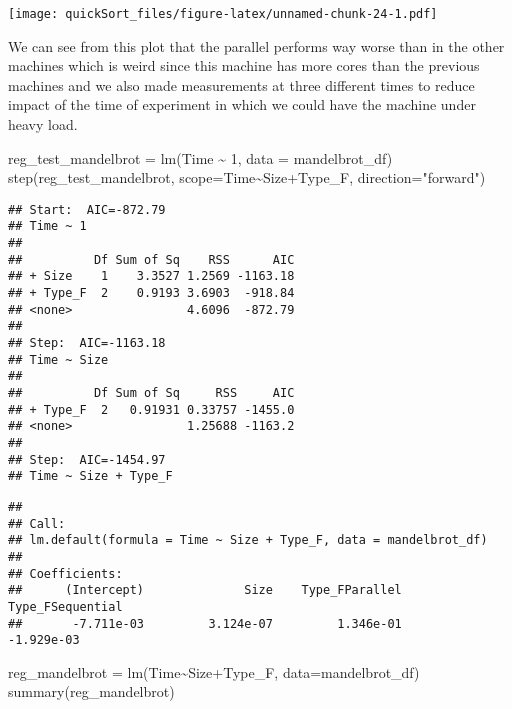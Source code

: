 \documentclass[
]{article}
\newenvironment{Shaded}{\begin{snugshade}}{\end{snugshade}}
\newcommand{\AttributeTok}[1]{\textcolor[rgb]{0.77,0.63,0.00}{#1}}
\newcommand{\DecValTok}[1]{\textcolor[rgb]{0.00,0.00,0.81}{#1}}
\newcommand{\FunctionTok}[1]{\textcolor[rgb]{0.00,0.00,0.00}{#1}}
\newcommand{\NormalTok}[1]{#1}
\newcommand{\OtherTok}[1]{\textcolor[rgb]{0.56,0.35,0.01}{#1}}
\newcommand{\SpecialCharTok}[1]{\textcolor[rgb]{0.00,0.00,0.00}{#1}}
\newcommand{\StringTok}[1]{\textcolor[rgb]{0.31,0.60,0.02}{#1}}
\begin{document}
\texttt{[image: quickSort\_files/figure-latex/unnamed-chunk-24-1.pdf]}

We can see from this plot that the parallel performs way worse than in
the other machines which is weird since this machine has more cores than
the previous machines and we also made measurements at three different
times to reduce impact of the time of experiment in which we could have
the machine under heavy load.

\begin{Shaded}
\begin{Highlighting}[]
\NormalTok{reg\_test\_mandelbrot }\OtherTok{=} \FunctionTok{lm}\NormalTok{(Time }\SpecialCharTok{\textasciitilde{}} \DecValTok{1}\NormalTok{, }\AttributeTok{data =}\NormalTok{ mandelbrot\_df)}
\FunctionTok{step}\NormalTok{(reg\_test\_mandelbrot, }\AttributeTok{scope=}\NormalTok{Time}\SpecialCharTok{\textasciitilde{}}\NormalTok{Size}\SpecialCharTok{+}\NormalTok{Type\_F, }\AttributeTok{direction=}\StringTok{"forward"}\NormalTok{)}
\end{Highlighting}
\end{Shaded}

\begin{verbatim}
## Start:  AIC=-872.79
## Time ~ 1
## 
##          Df Sum of Sq    RSS      AIC
## + Size    1    3.3527 1.2569 -1163.18
## + Type_F  2    0.9193 3.6903  -918.84
## <none>                4.6096  -872.79
## 
## Step:  AIC=-1163.18
## Time ~ Size
## 
##          Df Sum of Sq     RSS     AIC
## + Type_F  2   0.91931 0.33757 -1455.0
## <none>                1.25688 -1163.2
## 
## Step:  AIC=-1454.97
## Time ~ Size + Type_F
\end{verbatim}

\begin{verbatim}
## 
## Call:
## lm.default(formula = Time ~ Size + Type_F, data = mandelbrot_df)
## 
## Coefficients:
##      (Intercept)              Size    Type_FParallel  Type_FSequential  
##       -7.711e-03         3.124e-07         1.346e-01        -1.929e-03
\end{verbatim}

\begin{Shaded}
\begin{Highlighting}[]
\NormalTok{reg\_mandelbrot }\OtherTok{=} \FunctionTok{lm}\NormalTok{(Time}\SpecialCharTok{\textasciitilde{}}\NormalTok{Size}\SpecialCharTok{+}\NormalTok{Type\_F, }\AttributeTok{data=}\NormalTok{mandelbrot\_df)}
\FunctionTok{summary}\NormalTok{(reg\_mandelbrot)}
\end{Highlighting}
\end{Shaded}
\end{document}
